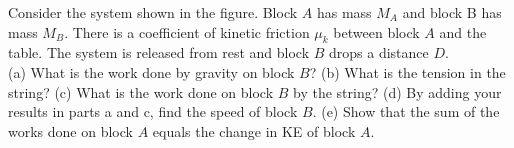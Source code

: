 Consider the system shown in the figure. Block $A$ has mass $M_A$ and
block B has mass $M_B$. There is a coefficient of kinetic friction
$\mu_k$ between block $A$ and the table. The system is released from
rest and block $B$ drops a distance $D$.\\
%
(a) What is the work done by gravity on block $B$?\answercheck\hwendpart
%
(b) What is the tension in the string?\answercheck\hwendpart
%
(c) What is the work done on block $B$ by the string?\answercheck\hwendpart
%
(d) By adding your results in parts a and c, find the speed of block
$B$.\answercheck\hwendpart
%
(e) Show that the sum of the works done on block $A$ equals the change
in KE of block $A$.
